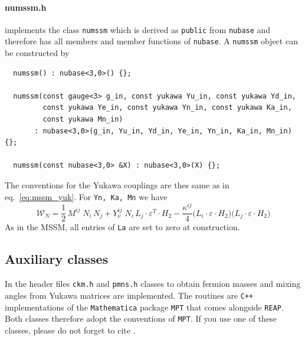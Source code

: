 \documentclass[11pt,a4paper]{article}
\begin{document}
\paragraph{numssm.h}
implements the class \texttt{numssm} which is derived as \texttt{public} from \texttt{nubase} and therefore has all members and member functions of \texttt{nubase}. A \texttt{numssm} object can be constructed by
\begin{lstlisting}
  numssm() : nubase<3,0>() {};
  
  numssm(const gauge<3> g_in, const yukawa Yu_in, const yukawa Yd_in,
         const yukawa Ye_in, const yukawa Yn_in, const yukawa Ka_in,
         const yukawa Mn_in)
       : nubase<3,0>(g_in, Yu_in, Yd_in, Ye_in, Yn_in, Ka_in, Mn_in) {};
  
  numssm(const nubase<3,0> &X) : nubase<3,0>(X) {};
\end{lstlisting}
The conventions for the Yukawa couplings are thes same as in eq.~\eqref{eq:mssm_yuk}. For \texttt{Yn, Ka, Mn} we have
\begin{equation} \label{eq:mssm_nu}
    \mathcal{W}_{N} = \frac{1}{2}\, M^{ij}\; N_i\, N_j + Y_\nu^{ij}\; N_i\, L_j \cdot \varepsilon^T \cdot H_2 -\frac{\kappa^{ij}}{4} \bigl(L_i\cdot \varepsilon \cdot H_2\bigr) \bigl(L_j\cdot \varepsilon \cdot H_2\bigr)
\end{equation}
As in the MSSM, all entries of \texttt{La} are set to zero at construction.

\subsection{\label{sec::auxiliary} Auxiliary classes}
In the header files \texttt{ckm.h} and \texttt{pmns.h} classes to obtain fermion masses and mixing angles from Yukawa matrices are implemented. The routines are \texttt{C++} implementations of the \texttt{Mathematica} package \texttt{MPT} that comes alongside \texttt{REAP}. Both classes therefore adopt the conventions of \texttt{MPT}. If you use one of these classes, please do not forget to cite \cite{Antusch:2005gp}.
\end{document}
